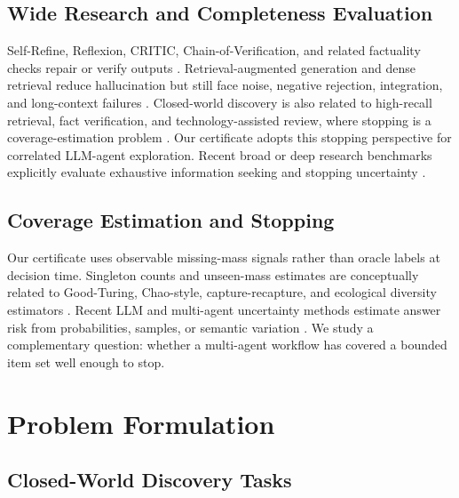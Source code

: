 \documentclass[letterpaper]{article}
\begin{document}
\subsection{Wide Research and Completeness Evaluation}

Self-Refine, Reflexion, CRITIC, Chain-of-Verification, and related factuality
checks repair or verify outputs
\citep{madaan2023selfrefine,shinn2023reflexion,gou2023critic,dhuliawala2023cov,
lin2021truthfulqa,manakul2023selfcheckgpt,li2023halueval}. Retrieval-augmented
generation and dense retrieval reduce hallucination but still face noise,
negative rejection, integration, and long-context failures
\citep{lewis2020rag,guu2020realm,karpukhin2020dpr,nakano2021webgpt,
chen2024rgb,li2024unigen,liu2023lost,asai2023selfrag,
gao2023ragsurvey}. Closed-world discovery is also related to high-recall
retrieval, fact verification, and technology-assisted review, where stopping is
a coverage-estimation problem
\citep{thorne2018fever,yang2018hotpotqa,grossman2015trec,
cormack2021tarstopping}. Our certificate adopts this stopping perspective for
correlated LLM-agent exploration.
Recent broad or deep research benchmarks explicitly evaluate exhaustive
information seeking and stopping uncertainty
\citep{wong2025widesearch,gupta2026deepsearchqa,rafiee2026trqa,
huang2026wideseek,kim2026seekergym}.

\subsection{Coverage Estimation and Stopping}

Our certificate uses observable missing-mass signals rather than oracle labels at
decision time. Singleton counts and unseen-mass estimates are conceptually
related to Good-Turing, Chao-style, capture-recapture, and ecological diversity
estimators \citep{good1953population,chao1984nonparametric,
mcAllester2000goodturing,chao2014rarefaction,bron2024chao}. Recent LLM and
multi-agent uncertainty methods
estimate answer risk from probabilities, samples, or semantic variation
\citep{kuhn2023semanticentropy,kadavath2022language,chen2026matu,
cole2023selectively}. We study a complementary question: whether a multi-agent
workflow has covered a bounded item set well enough to stop.

\section{Problem Formulation}

\subsection{Closed-World Discovery Tasks}
\end{document}
